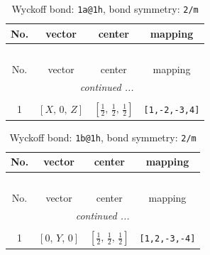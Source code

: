 \documentclass[fleqn,8pt]{jsarticle}
\begin{document}
\begin{longtable}{cccc}
\caption{Wyckoff bond: {\tt 1a@1h}, bond symmetry: {\tt 2/m}}
 \\
 \hline \hline
No. & vector & center & mapping \\ \hline \endfirsthead

\multicolumn{3}{l}{\tablename\ \thetable{}} \\
 \hline \hline
No. & vector & center & mapping \\ \hline \endhead

 \hline \hline
\multicolumn{3}{r}{\footnotesize\it continued ...} \\ \endfoot

 \hline \hline
\multicolumn{3}{r}{} \\ \endlastfoot

1 & $\left[ X,\, 0,\, Z \right]$ & $\left[ \frac{1}{2},\, \frac{1}{2},\, \frac{1}{2} \right]$ & {\tt [1,-2,-3,4]} \\
\end{longtable}
\renewcommand{\arraystretch}{1.2}
\begin{longtable}{cccc}
\caption{Wyckoff bond: {\tt 1b@1h}, bond symmetry: {\tt 2/m}}
 \\
 \hline \hline
No. & vector & center & mapping \\ \hline \endfirsthead

\multicolumn{3}{l}{\tablename\ \thetable{}} \\
 \hline \hline
No. & vector & center & mapping \\ \hline \endhead

 \hline \hline
\multicolumn{3}{r}{\footnotesize\it continued ...} \\ \endfoot

 \hline \hline
\multicolumn{3}{r}{} \\ \endlastfoot

1 & $\left[ 0,\, Y,\, 0 \right]$ & $\left[ \frac{1}{2},\, \frac{1}{2},\, \frac{1}{2} \right]$ & {\tt [1,2,-3,-4]} \\
\end{longtable}
\renewcommand{\arraystretch}{1.2}
\end{document}
